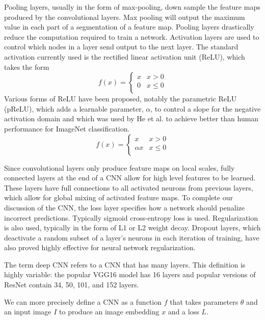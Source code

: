 Pooling layers, usually in the form of max-pooling, down sample the feature maps produced by the convolutional layers. Max pooling will output the maximum value in each part of a segmentation of a feature map. Pooling layers drastically reduce the computation required to train a network. Activation layers are used to control which nodes in a layer send output to the next layer. The standard activation currently used is the rectified linear activation unit (ReLU), which takes the form
\begin{equation}
	f(x) = \begin{cases}
	   x & x > 0 \\
	   0 & x\leq 0 \\
     \end{cases}
\end{equation}
Various forms of ReLU have been proposed, notably the parametric ReLU (pReLU), which adds a learnable parameter, $\alpha$, to control a slope for the negative activation domain and which was used by He et al. to achieve better than human performance for ImageNet classification.\cite{he2016deep}
\begin{equation}
	f(x) = \begin{cases}
	   x & x > 0 \\
	   \alpha x & x \leq 0 \\
     \end{cases}
\end{equation}

Since convolutional layers only produce feature maps on local scales, fully connected layers at the end of a CNN allow for high level features to be learned. These layers have full connections to all activated neurons from previous layers, which allow for global mixing of activated feature maps. To complete our discussion of the CNN, the loss layer specifies how a network should penalize incorrect predictions. Typically sigmoid cross-entropy loss is used. Regularization is also used, typically in the form of L1 or L2 weight decay. Dropout layers, which deactivate a random subset of a layer's neurons in each iteration of training, have also proved highly effective for neural network regularization.\cite{srivastava2014dropout}

The term deep CNN refers to a CNN that has many layers. This definition is highly variable: the popular VGG16 model has 16 layers\cite{simonyan2014very} and popular versions of ResNet contain 34, 50, 101, and 152 layers\cite{he2016deep}.

We can more precisely define a CNN as a function $f$ that takes parameters $\theta$ and an input image $I$ to produce an image embedding $x$ and a loss $L$.


